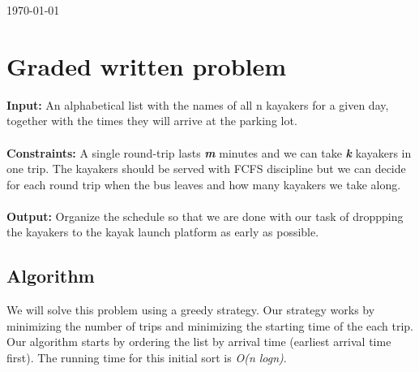 \documentclass[8pt]{article}
\begin{document}
\hfill \small{\today} \\
\setlength{\fboxrule}{.5mm}\setlength{\fboxsep}{1.2mm}
\newlength{\boxlength}\setlength{\boxlength}{\textwidth}
\addtolength{\boxlength}{-4mm}
\begin{center}\end{center}
\vspace{5mm}

\section{Graded written problem}

\textbf{Input:} An alphabetical list with the names of all n kayakers for a given day, together with the times they will arrive at the parking lot.
\\ \\
\textbf{Constraints:} A single round-trip lasts \textit{\textbf{m}} minutes and we can take \textit{\textbf{k}} kayakers in one trip. The kayakers should be served with FCFS discipline but we can decide for each round trip when the bus leaves and how many kayakers we take along.
\\ \\
\textbf{Output:} Organize the schedule so that we are done with our task of droppping the kayakers to the kayak launch platform as early as possible.

\subsection{Algorithm}
We will solve this problem using a greedy strategy. Our strategy works by minimizing the number of trips and minimizing the starting time of the each trip. Our algorithm starts by ordering the list by arrival time (earliest arrival time first). The running time for this initial sort is \textit{O(n logn)}.
\end{document}
